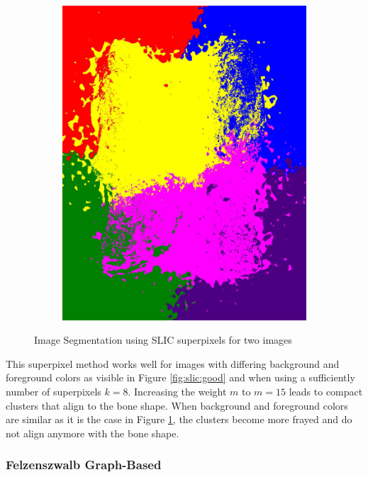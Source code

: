 \documentclass[pdftex,12pt,a4paper]{report}
\begin{document}
\begin{figure}[h]
\begin{subfigure}[b]{0.24\textwidth}
		\subcaption{}
		\label{fig:slic:bad}
	\end{subfigure}
	\begin{subfigure}[b]{0.24\textwidth}
		\centering
		\includegraphics[width=.9\linewidth]{img/segmentation/bad/slic/segmented.jpg}
		\subcaption*{}
		\label{}
	\end{subfigure}
	\caption{Image Segmentation using SLIC superpixels for two images}
	\label{fig:slic}
\end{figure}

This superpixel method works well for images with differing background and foreground colors as visible in Figure \ref{fig:slic:good} and when using a sufficiently number of superpixels $k=8$. Increasing the weight $m$ to $m=15$ leads to compact clusters that align to the bone shape. When background and foreground colors are similar as it is the case in Figure \ref{fig:slic:bad}, the clusters become more frayed and do not align anymore with the bone shape.

\subsubsection{Felzenszwalb Graph-Based}
\end{document}
